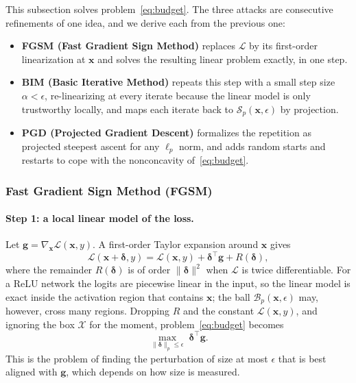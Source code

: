 \documentclass[10pt,a4paper]{extarticle}
\theoremstyle{definition}
\newcommand{\X}{\mathcal{X}}
\newcommand{\Loss}{\mathcal{L}}
\newcommand{\x}{\mathbf{x}}
\newcommand{\bdelta}{\boldsymbol{\delta}}
\newcommand{\B}{\mathcal{B}}
\begin{document}
This subsection solves problem~\eqref{eq:budget}. The three attacks are consecutive refinements of one idea, and we derive each from the previous one:
\begin{itemize}
  \item \textbf{FGSM (Fast Gradient Sign Method)} replaces \(\Loss\) by its first-order linearization at \(\x\) and solves the resulting linear problem exactly, in one step.
  \item \textbf{BIM (Basic Iterative Method)} repeats this step with a small step size \(\alpha<\epsilon\), re-linearizing at every iterate because the linear model is only trustworthy locally, and maps each iterate back to \(\mathcal{S}_p(\x,\epsilon)\) by projection.
  \item \textbf{PGD (Projected Gradient Descent)} formalizes the repetition as projected steepest ascent for any \(\ell_p\) norm, and adds random starts and restarts to cope with the nonconcavity of~\eqref{eq:budget}.
\end{itemize}

\subsubsection{Fast Gradient Sign Method (FGSM)}

\paragraph{Step 1: a local linear model of the loss.} Let \(\mathbf{g}=\nabla_{\x}\Loss(\x,y)\). A first-order Taylor expansion around \(\x\) gives
\begin{equation}\label{eq:lin}
\Loss(\x+\bdelta,y)=\Loss(\x,y)+\bdelta^\top\mathbf{g}+R(\bdelta),
\end{equation}
where the remainder \(R(\bdelta)\) is of order \(\|\bdelta\|^2\) when \(\Loss\) is twice differentiable. For a ReLU network the logits are piecewise linear in the input, so the linear model is exact inside the activation region that contains \(\x\); the ball \(\B_p(\x,\epsilon)\) may, however, cross many regions. Dropping \(R\) and the constant \(\Loss(\x,y)\), and ignoring the box \(\X\) for the moment, problem~\eqref{eq:budget} becomes
\begin{equation}\label{eq:linprob}
\max_{\|\bdelta\|_p\le\epsilon}\;\bdelta^\top\mathbf{g}.
\end{equation}
This is the problem of finding the perturbation of size at most \(\epsilon\) that is best aligned with \(\mathbf{g}\), which depends on how size is measured.
\end{document}
